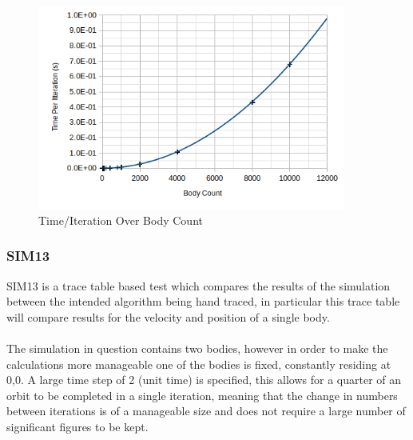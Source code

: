 \begin{figure}[!h]
  \centering
  \includegraphics[width=0.9\textwidth]{img/testingEvidence/perfgraph2.png}
  \caption{Time/Iteration Over Body Count}
\end{figure}

\pagebreak

\subsubsection{SIM13}
SIM13 is a trace table based test which compares the results of the simulation between the intended algorithm being hand traced, in particular this trace table will compare results for the velocity and position of a single body.

\paragraph{}
The simulation in question contains two bodies, however in order to make the calculations more manageable one of the bodies is fixed, constantly residing at 0,0. A large time step of 2 (unit time) is specified, this allows for a quarter of an orbit to be completed in a single iteration, meaning that the change in numbers between iterations is of a manageable size and does not require a large number of significant figures to be kept.

